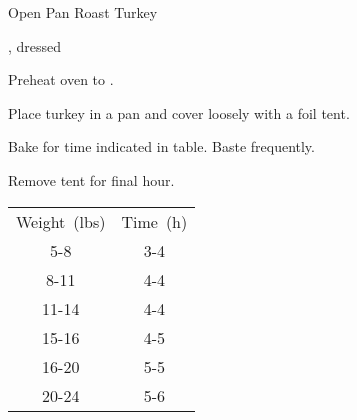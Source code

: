 \begin{recipe}{Open Pan Roast Turkey}{}{}

\begin{ingredients}
\item {}, dressed
\end{ingredients}

\begin{directions}
\item Preheat oven to .
\item Place turkey in a pan and cover loosely with a foil tent.
\item Bake for time indicated in table. Baste frequently.
\item Remove tent for final hour.
\end{directions}

\begin{tabular}{|cc|}
\hline
Weight~(lbs) & Time~(h) \\
5-8 & 3\quarter{}-4 \\
8-11 & 4-4\quarter{} \\
11-14 & 4\quarter{}-4\half{} \\
15-16 & 4\half{}-5 \\
16-20 & 5-5\threequarter{} \\
20-24 & 5\threequarter{}-6\half{} \\
\hline
\end{tabular}
\end{recipe}
